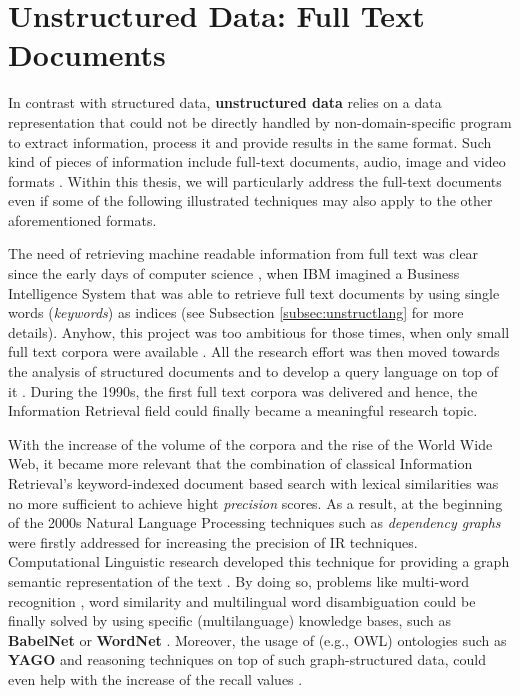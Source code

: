 \section{Unstructured Data: Full Text Documents}\label{sec:unstructured}
In contrast with structured data, \textbf{unstructured data} relies on a data representation that could not be directly handled by non-domain-specific program to extract information, process it and provide results in the same format. Such kind of pieces of information include full-text documents, audio, image and video formats \cite{SintSSF09}. Within this thesis, we will particularly address the full-text documents even if some of the following illustrated techniques may also apply to the other aforementioned formats.

The need of retrieving machine readable information from full text was clear since the early days of computer science  \cite{Luhn58}, when IBM imagined a Business Intelligence System that was able to retrieve full text documents by using single words (\textit{keywords}) as indices (see Subsection \vref{subsec:unstructlang} for more details). Anyhow, this project was too ambitious for those times, when only small full text corpora were available \cite{Singhal01}. All the research effort was then moved towards the analysis of structured documents and to develop a query language on top of it \cite{Codd71a}. During the 1990s, the first full text corpora was delivered \cite{nlacat} and hence, the Information Retrieval field could finally became a meaningful research topic. 

With the increase of the volume of the corpora and the rise of the World Wide Web, it became more relevant that the combination of classical Information Retrieval's  keyword-indexed document based search \cite{Manning} with lexical similarities \cite{KohailBiemann} was no more sufficient to achieve hight \textit{precision} scores. As a result, at the beginning of the 2000s \cite{Brants03} Natural Language Processing techniques such as \textit{dependency graphs} were firstly addressed for increasing the precision of IR techniques. Computational Linguistic research developed this technique for providing a graph semantic representation of the text \cite{Iglesias}. By doing so, problems like multi-word recognition \cite{Lossio-Ventura2014}, word similarity \cite{SemSim} and multilingual word disambiguation \cite{MultiWordSense} could be finally solved by using specific (multilanguage) knowledge bases, such as \textbf{BabelNet} \cite{Navigli12} or \textbf{WordNet} \cite{WordNet}. Moreover, the usage of (e.g., OWL) ontologies such as \textbf{YAGO} \cite{IBMWatson} and reasoning techniques on top of such graph-structured data, could even help with the increase of the recall values \cite{WeltyM06}. 

